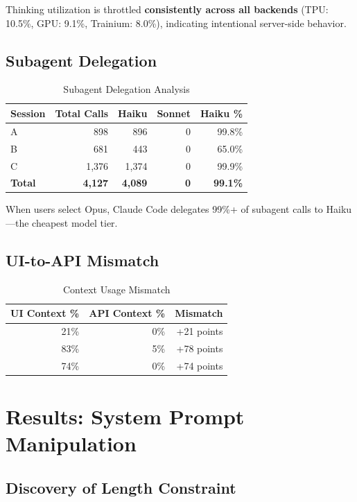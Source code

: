 \documentclass[11pt,a4paper]{article}
\begin{document}
Thinking utilization is throttled \textbf{consistently across all backends} (TPU: 10.5\%, GPU: 9.1\%, Trainium: 8.0\%), indicating intentional server-side behavior.

\subsection{Subagent Delegation}

\begin{table}[H]
\centering
\caption{Subagent Delegation Analysis}
\begin{tabular}{lrrrr}
\toprule
Session & Total Calls & Haiku & Sonnet & Haiku \% \\
\midrule
A & 898 & 896 & 0 & 99.8\% \\
B & 681 & 443 & 0 & 65.0\% \\
C & 1,376 & 1,374 & 0 & 99.9\% \\
\textbf{Total} & \textbf{4,127} & \textbf{4,089} & \textbf{0} & \textbf{99.1\%} \\
\bottomrule
\end{tabular}
\end{table}

When users select Opus, Claude Code delegates 99\%+ of subagent calls to Haiku---the cheapest model tier.

\subsection{UI-to-API Mismatch}

\begin{table}[H]
\centering
\caption{Context Usage Mismatch}
\begin{tabular}{rrr}
\toprule
UI Context \% & API Context \% & Mismatch \\
\midrule
21\% & 0\% & +21 points \\
83\% & 5\% & +78 points \\
74\% & 0\% & +74 points \\
\bottomrule
\end{tabular}
\end{table}

\section{Results: System Prompt Manipulation}

\subsection{Discovery of Length Constraint}
\end{document}
